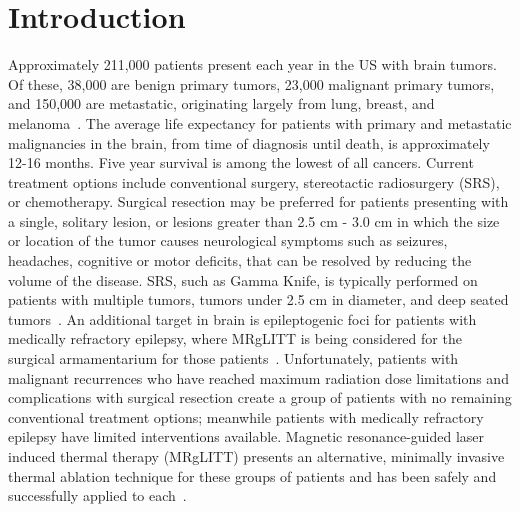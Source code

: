 \documentclass[12pt]{article}
\begin{document}
\section{Introduction}

Approximately 211,000 patients present each year in the US with brain
tumors.  Of these, 38,000 are benign primary tumors, 23,000 malignant
primary tumors, and 150,000 are metastatic, originating largely from lung,
breast, and melanoma~\cite{NCIFact13,
kalkanis2010evidence,gavrilovic2005brain,bafaloukos2004treatment,Owonikoko2014}.
The average life expectancy for patients with primary and metastatic
malignancies in the brain, from time of diagnosis until death, is
approximately 12-16 months. Five year survival is among the lowest of all
cancers. Current treatment options include conventional surgery,
stereotactic radiosurgery (SRS), or chemotherapy.  
Surgical resection may be preferred for patients presenting with a single,
solitary lesion, or lesions greater than 2.5 cm - 3.0 cm in which the size
or location of the tumor causes neurological symptoms such as seizures,
headaches, cognitive or motor deficits, that can be resolved by reducing
the volume of the disease.
SRS, such as Gamma Knife\textsuperscript{\textregistered}, is typically performed on patients with multiple
tumors, tumors under 2.5 cm in diameter, and deep seated tumors~\cite{alexander1995stereotactic}.
An additional target in brain is
epileptogenic foci for patients with medically refractory epilepsy,
where MRgLITT is being considered for the surgical armamentarium for those patients~\cite{curry2012mr,Nowell2014}.
Unfortunately, patients with malignant recurrences who have reached max{\color{red}imum} radiation dose
limitations and complications with surgical resection create a group of
patients with no remaining conventional treatment options;
meanwhile patients with medically refractory epilepsy have limited interventions available.
Magnetic resonance-guided laser induced thermal therapy (MRgLITT) presents
an alternative, minimally invasive thermal ablation technique for these
groups of patients and has been safely and successfully applied to 
each~\cite{carpentieretal08,carpentier2011laser,
carpentier2012mr,torres2013stereotactic,jethwa2012magnetic,
schwarzmaier2002basic,schulze2004laser}. 
\end{document}
